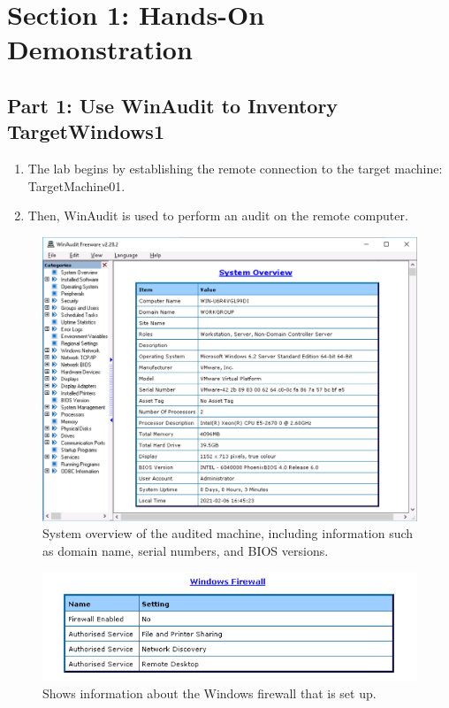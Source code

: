 \section{Section 1: Hands-On Demonstration}
\subsection{Part 1: Use WinAudit to Inventory TargetWindows1}
\begin{enumerate}
    \item The lab begins by establishing the remote connection to the target machine:\\
    TargetMachine01.
    \item Then, WinAudit is used to perform an audit on the remote computer.
\end{enumerate}

\begin{figure}[H]
    \centering
    \includegraphics[width=\linewidth]{figures/pic1.png}
    \caption{System overview of the audited machine, including information such as domain name, serial numbers, and BIOS versions.}
\end{figure}

\begin{figure}[H]
    \centering
    \includegraphics[width=0.8\linewidth]{figures/pic2.png}
    \caption{Shows information about the Windows firewall that is set up.}
\end{figure}

